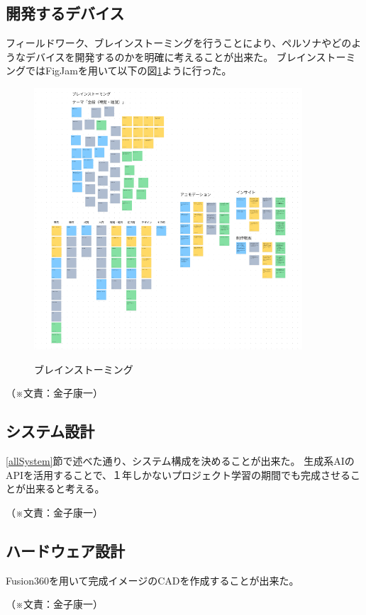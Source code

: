 \documentclass[12pt,a4paper]{report}
\newcommand{\Writer}[1]{
  \normalsize
  \begin{flushright}
    （※文責：#1）
  \end{flushright}
}
\begin{document}
\subsection{開発するデバイス}
\noindent\space
フィールドワーク、ブレインストーミングを行うことにより、ペルソナやどのようなデバイスを開発するのかを明確に考えることが出来た。
ブレインストーミングではFigJamを用いて以下の図\ref{fig:figjam}ように行った。
\begin{figure}[htbp]
  \centering %
  \includegraphics[width=100mm]{images/figjam.png}\\
  \caption{ブレインストーミング}
  \label{fig:figjam}
\end{figure}
\Writer{金子康一}

\subsection{システム設計}
\noindent\space
\ref{allSystem}節で述べた通り、システム構成を決めることが出来た。
生成系AIのAPIを活用することで、１年しかないプロジェクト学習の期間でも完成させることが出来ると考える。
\Writer{金子康一}

\subsection{ハードウェア設計}
\noindent\space
Fusion360を用いて完成イメージのCADを作成することが出来た。
\Writer{金子康一}
\end{document}
